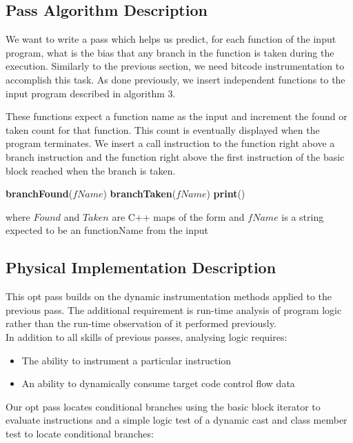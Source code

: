 \subsection{Pass Algorithm Description}

We want to write a pass which helps us predict, for each function of the input program, what is the bias that any branch in the function is taken during the execution. Similarly to the previous section, we need bitcode instrumentation to accomplish this task. As done previously, we insert independent functions to the input program described in algorithm 3.

These functions expect a function name as the input and increment the found or taken count for that function. This count is eventually displayed when the program terminates. We insert a call instruction to the  function right above a branch instruction and the  function right above the first instruction of the basic block reached when the branch is taken.

\begin{algorithm}[here]
\textbf{branchFound}($fName$) 
\textbf{branchTaken}($fName$) 
\textbf{print}() 
\caption{where $Found$ and $Taken$ are C++ maps of the form  and $fName$ is a string expected to be an functionName from the input}
\end{algorithm}

\subsection{Physical Implementation Description}
This opt pass builds on the dynamic instrumentation methods applied to the previous pass. The additional requirement is run-time analysis of program logic rather than the run-time observation of it performed previously. \\
In addition to all skills of previous passes, analysing logic requires:\\ 
\begin{itemize}
\item The ability to instrument a particular instruction
\item An ability to dynamically consume target code control flow data
\end{itemize}
Our opt pass locates conditional branches using the basic block iterator to evaluate instructions and a simple logic test of a dynamic cast and class member test to locate conditional branches:\\

